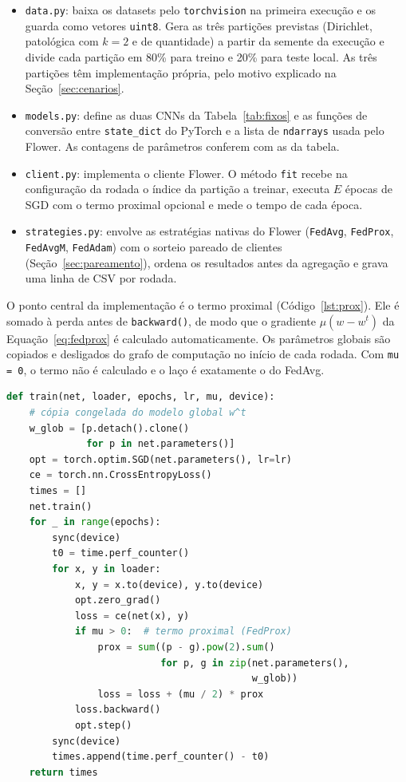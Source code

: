 \begin{itemize}[leftmargin=*, itemsep=1pt]
    \item \texttt{data.py}: baixa os datasets pelo \texttt{torchvision} na primeira execução e os guarda como vetores \texttt{uint8}. Gera as três partições previstas (Dirichlet, patológica com $k = 2$ e de quantidade) a partir da semente da execução e divide cada partição em 80\% para treino e 20\% para teste local. As três partições têm implementação própria, pelo motivo explicado na Seção~\ref{sec:cenarios}.
    \item \texttt{models.py}: define as duas CNNs da Tabela~\ref{tab:fixos} e as funções de conversão entre \texttt{state\_dict} do PyTorch e a lista de \texttt{ndarrays} usada pelo Flower. As contagens de parâmetros conferem com as da tabela.
    \item \texttt{client.py}: implementa o cliente Flower. O método \texttt{fit} recebe na configuração da rodada o índice da partição a treinar, executa $E$ épocas de SGD com o termo proximal opcional e mede o tempo de cada época.
    \item \texttt{strategies.py}: envolve as estratégias nativas do Flower (\texttt{FedAvg}, \texttt{FedProx}, \texttt{FedAvgM}, \texttt{FedAdam}) com o sorteio pareado de clientes (Seção~\ref{sec:pareamento}), ordena os resultados antes da agregação e grava uma linha de CSV por rodada.
\end{itemize}

O ponto central da implementação é o termo proximal (Código~\ref{lst:prox}). Ele é somado à perda antes de \texttt{backward()}, de modo que o gradiente $\mu(w - w^t)$ da Equação~\eqref{eq:fedprox} é calculado automaticamente. Os parâmetros globais são copiados e desligados do grafo de computação no início de cada rodada. Com \texttt{mu = 0}, o termo não é calculado e o laço é exatamente o do FedAvg.

\begin{lstlisting}[language=Python, caption={Laço de treinamento local com o termo proximal (\texttt{client.py}).}, label={lst:prox}]
def train(net, loader, epochs, lr, mu, device):
    # cópia congelada do modelo global w^t
    w_glob = [p.detach().clone()
              for p in net.parameters()]
    opt = torch.optim.SGD(net.parameters(), lr=lr)
    ce = torch.nn.CrossEntropyLoss()
    times = []
    net.train()
    for _ in range(epochs):
        sync(device)
        t0 = time.perf_counter()
        for x, y in loader:
            x, y = x.to(device), y.to(device)
            opt.zero_grad()
            loss = ce(net(x), y)
            if mu > 0:  # termo proximal (FedProx)
                prox = sum((p - g).pow(2).sum()
                           for p, g in zip(net.parameters(),
                                           w_glob))
                loss = loss + (mu / 2) * prox
            loss.backward()
            opt.step()
        sync(device)
        times.append(time.perf_counter() - t0)
    return times
\end{lstlisting}

